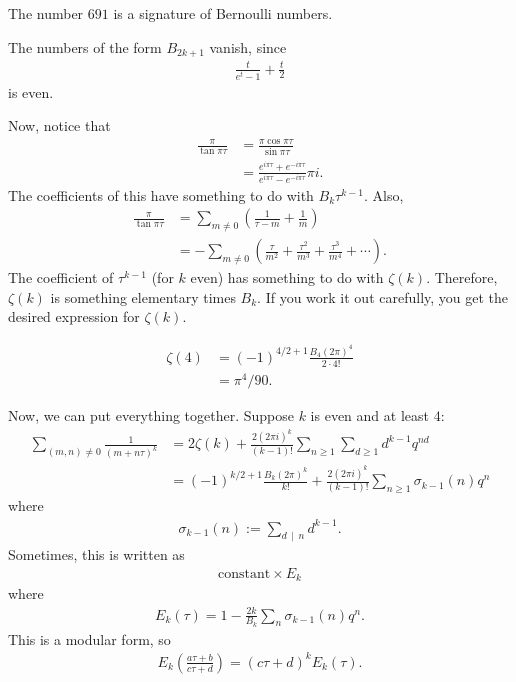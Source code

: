 \documentclass[11pt, oneside,margin=1in]{article}
\begin{document}
\begin{remark}
	The number $691$ is a signature of Bernoulli numbers.
\end{remark}

\begin{remark}
	The numbers of the form $B_{2k+1}$ vanish, since 
	\begin{align*}
		\frac{t}{e^t-1} + \frac{t}{2} 
	\end{align*}
	is even.
\end{remark}

Now, notice that
\begin{align*}
	\frac{\pi}{\tan \pi \tau} &= \frac{\pi\cos\pi \tau}{\sin\pi\tau}\\
				  &= \frac{e^{i\pi \tau} + e^{-i\pi\tau}}{e^{i\pi \tau} - e^{-i\pi \tau}} \pi i.
\end{align*}
The coefficients of this have something to do with $B_k \tau^{k-1}$. Also,
\begin{align*}
	\frac{\pi}{\tan \pi \tau} &= \sum_{m\ne 0}^{} \left( \frac{1}{\tau-m}+\frac{1}{m} \right) \\
				  &= -\sum_{m\ne 0}^{} \left( \frac{\tau}{m^2}+\frac{\tau^2}{m^3}+\frac{\tau^3}{m^4}+\cdots \right).  
\end{align*}
The coefficient of $\tau^{k-1}$ (for $k$ even) has something to do with $\zeta(k)$. Therefore, $\zeta(k)$ is something elementary times $B_k$. If you work it out carefully, you get the desired expression for $\zeta(k)$.

\begin{example}[ ]\label{}\text{}
\begin{align*}
	\zeta(4) &=  (-1)^{4/2 + 1}  \frac{B_4(2\pi)^4}{2\cdot 4!}\\
		 &= \pi^4/90.
\end{align*}
\end{example}

Now, we can put everything together. Suppose $k$ is even and at least $4$:
\begin{align*}
	\sum_{(m,n) \ne 0}^{} \frac{1}{(m+n\tau) ^k} &= 2\zeta(k) +  \frac{2(2\pi i) ^k}{(k-1) !} \sum_{n\ge 1}^{} \sum_{d\ge 1}^{} d^{k-1}q^{nd}\\
						     &= (-1)^{k/2 + 1}  \frac{B_k (2\pi) ^k}{k!} + \frac{2(2\pi i) ^k}{(k-1) !} \sum_{n\ge 1}^{}  \sigma_{k-1} (n) q^n
\end{align*}
where
\begin{align*}
	\sigma_{k-1} (n) :=  \sum_{d\,\mid\, n}^{} d^{k-1}.
\end{align*}
Sometimes, this is written as
\begin{align*}
	\textrm{constant} \times E_k
\end{align*}
where
\begin{align*}
	E_k(\tau) = 1 -  \frac{2k}{B_k}\sum_{n}^{} \sigma_{k-1}(n) q^n.
\end{align*}
This is a modular form, so
\begin{align*}
	E_k\left(\frac{a\tau + b}{c\tau + d}\right) =(c\tau + d) ^k E_k(\tau).
\end{align*}
\end{document}

